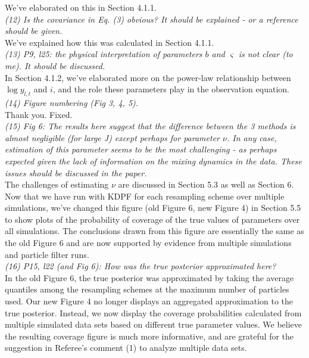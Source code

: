 \documentclass{article}
\begin{document}
We've elaborated on this in Section 4.1.1. \\

\noindent \emph{(12) Is the covariance in Eq. (3) obvious? It should be explained - or a reference should be given.} \\

We've explained how this was calculated in Section 4.1.1. \\

\noindent \emph{(13) P9, l25: the physical interpretation of parameters $b$ and $\varsigma$ is not clear (to me). It should be discussed.} \\

In Section 4.1.2, we've elaborated more on the power-law relationship between $\log y_{l,t}$ and $i$, and the role these parameters play in the observation equation. \\

\noindent \emph{(14) Figure numbering (Fig 3, 4, 5).} \\

Thank you. Fixed. \\

\noindent \emph{(15) Fig 6: The results here suggest that the difference between the 3 methods is almost negligible (for large J) except perhaps for parameter $\nu$. In any case, estimation of this parameter seems to be the most challenging - as perhaps expected given the lack of information on the mixing dynamics in the data. These issues should be discussed in the paper.} \\

The challenges of estimating $\nu$ are discussed in Section 5.3 as well as Section 6. Now that we have run with KDPF for each resampling scheme over multiple simulations, we've changed this figure (old Figure 6, new Figure 4) in Section 5.5 to show plots of the probability of coverage of the true values of parameters over all simulations. The conclusions drawn from this figure are essentially the same as the old Figure 6 and are now supported by evidence from multiple simulations and particle filter runs. \\

\noindent \emph{(16) P15, l22 (and Fig 6): How was the true posterior approximated here?} \\

In the old Figure 6, the true posterior was approximated by taking the average quantiles among the resampling schemes at the maximum number of particles used. Our new Figure 4 no longer displays an aggregated approximation to the true posterior. Instead, we now display the coverage probabilities calculated from multiple simulated data sets based on different true parameter values. We believe the resulting coverage figure is much more informative, and are grateful for the suggestion in Referee's comment (1) to analyze multiple data sets. \\
\end{document}
